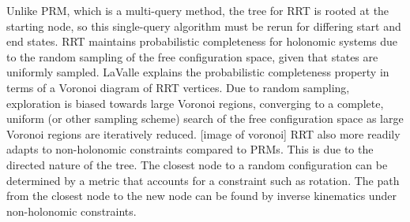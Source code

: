 \documentclass[12pt]{article}
\begin{document}
            \par Unlike PRM, which is a multi-query method, the tree for RRT is rooted at the starting node, so this single-query algorithm must be rerun for differing start and end states. RRT maintains probabilistic completeness for holonomic systems due to the random sampling of the free configuration space, given that states are uniformly sampled. LaValle explains the probabilistic completeness property in terms of a Voronoi diagram of RRT vertices. Due to random sampling, exploration is biased towards large Voronoi regions, converging to a complete, uniform (or other sampling scheme) search of the free configuration space as large Voronoi regions are iteratively reduced. [image of voronoi] RRT also more readily adapts to non-holonomic constraints compared to PRMs. This is due to the directed nature of the tree. The closest node to a random configuration can be determined by a metric that accounts for a constraint such as rotation. The path from the closest node to the new node can be found by inverse kinematics under non-holonomic constraints.
\end{document}
